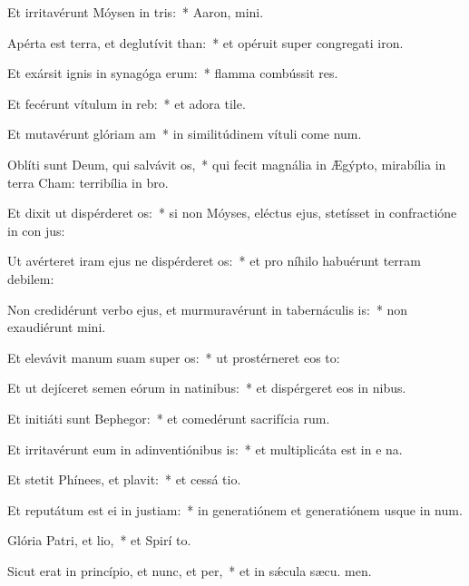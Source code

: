 \item Et irritavérunt Móysen in tris:~* Aaron,  mini.
\item Apérta est terra, et deglutívit than:~* et opéruit super congregati iron.
\item Et exársit ignis in synagóga erum:~* flamma combússit res.
\item Et fecérunt vítulum in reb:~* et adora tile.
\item Et mutavérunt glóriam am~* in similitúdinem vítuli come num.
\item Oblíti sunt Deum, qui salvávit os,~* qui fecit magnália in Ægýpto, mirabília in terra Cham: terribília in  bro.
\item Et dixit ut dispérderet os:~* si non Móyses, eléctus ejus, stetísset in confractióne in con jus:
\item Ut avérteret iram ejus ne dispérderet os:~* et pro níhilo habuérunt terram debilem:
\item Non credidérunt verbo ejus, et murmuravérunt in tabernáculis is:~* non exaudiérunt  mini.
\item Et elevávit manum suam super os:~* ut prostérneret eos  to:
\item Et ut dejíceret semen eórum in natinibus:~* et dispérgeret eos in nibus.
\item Et initiáti sunt Bephegor:~* et comedérunt sacrifícia rum.
\item Et irritavérunt eum in adinventiónibus is:~* et multiplicáta est in e na.
\item Et stetit Phínees, et plavit:~* et cessá tio.
\item Et reputátum est ei in justiam:~* in generatiónem et generatiónem usque in num.
\item Glória Patri, et lio,~* et Spirí to.
\item Sicut erat in princípio, et nunc, et per,~* et in sǽcula sæcu. men.
